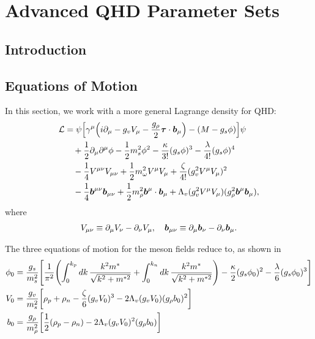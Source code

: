 \newcommand{\B}{{\boldsymbol b}}

\chapter{Advanced QHD Parameter Sets}

\section{Introduction}

\section{Equations of Motion}


In this section, we work with a more general Lagrange density for QHD:
\begin{align}
    \Lag & = \psi \bqty{\gamma^\mu\qty(i\p_\mu -g_vV_\mu - \frac{g_\rho}{2}{\boldsymbol\tau}\cdot {\boldsymbol b}_\mu)-(M-g_s\phi)}\psi\nonumber\\
    & \quad + \frac{1}{2}\p_\mu \p^\mu \phi - \frac{1}{2}m_s^2\phi^2 - \frac{\kappa}{3!}(g_s\phi)^3 - \frac{\lambda}{4!}(g_s\phi)^4 \nonumber\\
    & \quad - \frac{1}{4} V^{\mu\nu}V_{\mu\nu} + \frac{1}{2} m_\omega^2 V^\mu V_\mu + \frac{\zeta}{4!}(g_v^2 V^\mu V_\mu)^2 \nonumber\\
    & \quad - \frac{1}{4} \B^{\mu\nu} \B_{\mu\nu} + \frac{1}{2}m_\rho^2 \B^\mu \cdot \B_\mu + \Lambda_v (g_v^2 V^\mu V_\mu)(g_\rho^2 \B^\mu \B_\mu),
\end{align}
where
\begin{align*}
    V_{\mu\nu} \Def \p_\mu V_\nu - \p_\nu V_\mu, \quad
    \B_{\mu\nu} \Def \p_\mu \B_\nu - \p_\nu \B_\mu.
\end{align*}


The three equations of motion for the meson fields reduce to, as shown in \autocite[p. 79]{diener_2008}
\begin{align}
    \phi_0 & = \frac{g_s}{m_s^2}\bqty{\frac{1}{\pi^2} \pqty{\int_0^{k_p} \dd{k} \frac{k^2 m^*}{\sqrt{k^2 + m^{*2}}} + \int_0^{k_n} \dd{k} \frac{k^2 m^*}{\sqrt{k^2 + m^{*2}}}} -\frac{\kappa}{2}(g_s\phi_0)^2 -\frac{\lambda}{6}(g_s\phi_0)^3 }\nonumber\\
    V_0 & = \frac{g_v}{m_s^2} \bqty{\rho_p + \rho_n - \frac{\zeta}{6}(g_v V_0)^3 - 2 \Lambda_v (g_vV_0)(g_\rho b_0)^2}\nonumber\\
    b_0 & = \frac{g_\rho}{m_\rho^2} \bqty{\frac{1}{2}(\rho_p - \rho_n) - 2\Lambda_v(g_vV_0)^2(g_\rho b_0)}
\end{align}

